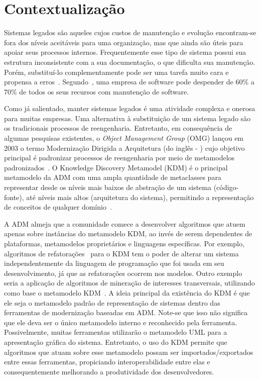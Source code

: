 
\section{Contextualização}\label{sec:contexto}

Sistemas legados são aqueles cujos custos de manutenção e evolução encontram-se fora dos níveis aceitáveis para uma organização, mas que ainda são úteis para apoiar seus processos internos. Frequentemente esse tipo de sistema possui sua estrutura inconsistente com a sua documentação, o que dificulta sua manutenção. Porém, substituí-lo complementamente pode ser uma tarefa muito cara e propensa a erros~\cite{Pressman_2009}. Segundo~, uma empresa de software pode despender de 60\% a 70\% de todos os seus recursos com manutenção de software.

Como já salientado, manter sistemas legados é uma atividade complexa e onerosa para muitas empresas. Uma alternativa à substituição de um sistema legado são os tradicionais processos de reengenharia. Entretanto, em consequência de algumas pesquisas existentes, o \textit{Object Management Group} (OMG) lançou em 2003 o termo Modernização Dirigida a Arquitetura (do inglês - ) cujo objetivo principal é padronizar processos de reengenharia por meio de metamodelos padronizados~\cite{ADM:OMG}. O Knowledge Discovery Metamodel (KDM) é o principal metamodelo da ADM com uma ampla quantidade de metaclasses para representar desde os níveis mais baixos de abstração de um sistema (código-fonte), até níveis mais altos (arquitetura do sistema), permitindo a representação de conceitos de qualquer domínio~\cite{KDM:specification,KDM:ISO}. %
 
A ADM almeja que a comunidade comece a desenvolver algoritmos que atuem apenas sobre instâncias do metamodelo KDM, ao invés de serem dependentes de plataformas, metamodelos proprietários e linguagens específicas. Por exemplo, algoritmos de refatorações~\cite{durelli_catalogo} para o KDM tem o poder de alterar um sistema independentemente da linguagem de programação que foi usada em seu desenvolvimento, já que as refatorações ocorrem nos modelos. Outro exemplo seria a aplicação de algoritmos de mineração de interesses transversais, utilizando como base o metamodelo KDM~\cite{Durelli:2013_ACM, dani_san, daniel_san_journal}. 
%
A ideia principal da existência do  KDM  é que ele seja o metamodelo padrão de representação de sistemas  dentro das ferramentas de modernização baseadas em ADM. Note-se que isso não significa que ele deva ser o único metamodelo interno e reconhecido pela ferramenta. Possivelmente, muitas ferramentas utilizarão o metamodelo UML para a apresentação gráfica do sistema. Entretanto, o  uso do KDM permite que algoritmos que atuam sobre esse metamodelo  possam ser importados/exportados entre essas ferramentas, propiciando interoperabilidade entre elas e consequentemente melhorando a produtividade dos desenvolvedores.

